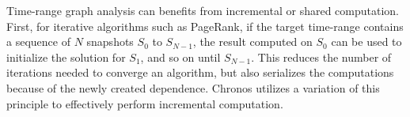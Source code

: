 \documentclass{svjour3}
\begin{document}



\vspace{2mm}

 Time-range graph analysis can benefits from incremental or shared computation. First, for iterative algorithms such as PageRank, if the target time-range contains a sequence of $N$ snapshots $S_0$ to $S_{N-1}$, the result computed on $S_0$ can be used to initialize the solution for $S_1$, and so on until $S_{N-1}$. This reduces the number of iterations needed to converge an algorithm, but also serializes the computations because of the newly created dependence. Chronos utilizes a variation of this principle to effectively perform incremental computation. 
\end{document}
